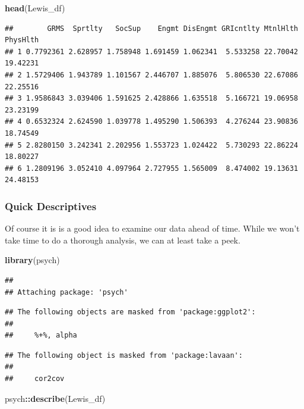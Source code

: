 \documentclass[
  11pt,
]{book}
\newenvironment{Shaded}{\begin{snugshade}}{\end{snugshade}}
\newcommand{\FunctionTok}[1]{\textcolor[rgb]{0.27,0.27,0.27}{\textbf{#1}}}
\newcommand{\NormalTok}[1]{#1}
\newcommand{\SpecialCharTok}[1]{\textcolor[rgb]{0.43,0.43,0.43}{\textbf{#1}}}
\begin{document}
\begin{Shaded}
\begin{Highlighting}[]
\FunctionTok{head}\NormalTok{(Lewis\_df)}
\end{Highlighting}
\end{Shaded}

\begin{verbatim}
##        GRMS  Sprtlty   SocSup    Engmt DisEngmt GRIcntlty MtnlHlth PhysHlth
## 1 0.7792361 2.628957 1.758948 1.691459 1.062341  5.533258 22.70042 19.42231
## 2 1.5729406 1.943789 1.101567 2.446707 1.885076  5.806530 22.67086 22.25516
## 3 1.9586843 3.039406 1.591625 2.428866 1.635518  5.166721 19.06958 23.23199
## 4 0.6532324 2.624590 1.039778 1.495290 1.506393  4.276244 23.90836 18.74549
## 5 2.8280150 3.242341 2.202956 1.553723 1.024422  5.730293 22.86224 18.80227
## 6 1.2809196 3.052410 4.097964 2.727955 1.565009  8.474002 19.13631 24.48153
\end{verbatim}

\hypertarget{quick-descriptives}{%
\subsubsection{Quick Descriptives}\label{quick-descriptives}}

Of course it is is a good idea to examine our data ahead of time. While we won't take time to do a thorough analysis, we can at least take a peek.

\begin{Shaded}
\begin{Highlighting}[]
\FunctionTok{library}\NormalTok{(psych)}
\end{Highlighting}
\end{Shaded}

\begin{verbatim}
## 
## Attaching package: 'psych'
\end{verbatim}

\begin{verbatim}
## The following objects are masked from 'package:ggplot2':
## 
##     %+%, alpha
\end{verbatim}

\begin{verbatim}
## The following object is masked from 'package:lavaan':
## 
##     cor2cov
\end{verbatim}

\begin{Shaded}
\begin{Highlighting}[]
\NormalTok{psych}\SpecialCharTok{::}\FunctionTok{describe}\NormalTok{(Lewis\_df)}
\end{Highlighting}
\end{Shaded}
\end{document}
